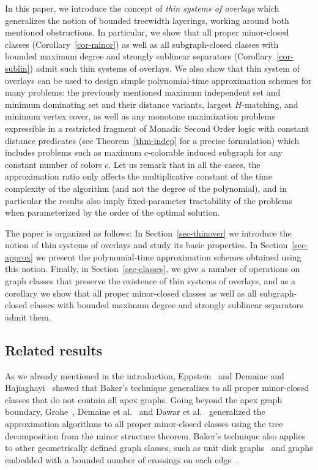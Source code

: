 \documentclass[a4paper,11pt]{article}
\begin{document}
In this paper, we introduce the concept of \emph{thin systems of overlays} which generalizes the notion of bounded treewidth layerings,
working around both mentioned obstructions.  In particular, we show that all proper minor-closed classes (Corollary~\ref{cor-minor})
as well as all subgraph-closed classes with bounded maximum degree and strongly sublinear separators (Corollary~\ref{cor-sublin}) admit such thin systems of overlays.
We also show that thin system of overlays can be used to design simple polynomial-time approximation schemes for many problems:
the previously mentioned maximum independent set and minimum dominating set and their distance variants,
largest $H$-matching, and minimum vertex cover, as well as any monotone maximization problems
expressible in a restricted fragment of Monadic Second Order logic with constant distance predicates
(see Theorem~\ref{thm-indep} for a precise formulation) which includes problems such as maximum $c$-colorable induced
subgraph for any constant number of colors $c$.  Let us remark that in all the cases, the approximation ratio only affects the multiplicative
constant of the time complexity of the algorithm (and not the degree of the polynomial), and in particular the results
also imply fixed-parameter tractability of the problems when parameterized by the order of the optimal solution.

The paper is organized as follows: In Section~\ref{sec-thinover} we introduce the notion of thin systems of overlays
and study its basic properties.  In Section~\ref{sec-approx} we present the polynomial-time approximation schemes obtained
using this notion.  Finally, in Section~\ref{sec-classes}, we give a number of operations on graph classes that
preserve the existence of thin systems of overlays, and as a corollary we show that all proper minor-closed classes as well as
all subgraph-closed classes with bounded maximum degree and strongly sublinear separators admit them.

\subsection{Related results}

As we already mentioned in the introduction, Eppstein~\cite{eppstein00} and Demaine and Hajiaghayi~\cite{demaine2004equivalence}
showed that Baker's technique generalizes
to all proper minor-closed classes that do not contain all apex graphs.  Going beyond the apex graph boundary, Grohe~\cite{grohe2003local},
Demaine et al.~\cite{demaine2005algorithmic} and Dawar et al.~\cite{dawar2006approximation} generalized
the approximation algorithms to all proper minor-closed classes using the tree decomposition from the minor structure theorem.
Baker's technique also applies to other geometrically defined graph classes, such as unit disk graphs~\cite{hunt1998nc}
and graphs embedded with a bounded number of crossings on each edge~\cite{grigoriev2007algorithms}.
\end{document}
